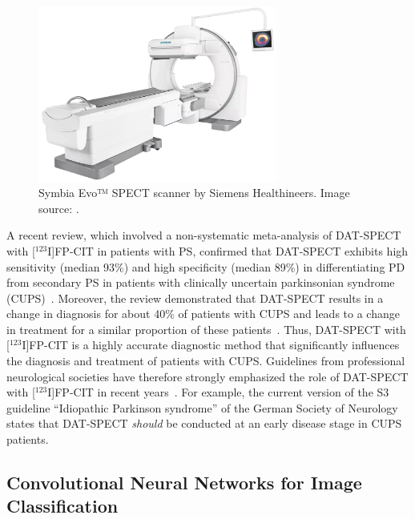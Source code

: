 \begin{figure}[ht]
  \centering
  \includegraphics[width=0.7\textwidth]{content/figures/siemens-healthineers_MI_symbia-evo.png}
  \caption{Symbia Evo™ SPECT scanner by Siemens Healthineers. Image source: \cite{SymbiaEvo_siemens}.} 
  \label{fig:siemens-healthineers_MI_symbia-evo}
\end{figure}

A recent review, which involved a non-systematic meta-analysis of DAT-SPECT with [$^{123}$I]FP-CIT in patients with PS, 
confirmed that DAT-SPECT exhibits high sensitivity (median 93\%) and high specificity (median 89\%) 
in differentiating PD from secondary PS in patients with 
clinically uncertain parkinsonian syndrome (CUPS)~\citep{Buchert2019-ya}.
Moreover, the review demonstrated that DAT-SPECT results in a change in diagnosis for about 40\% of patients with CUPS
and leads to a change in treatment for a similar proportion of these patients~\citep{Buchert2019-ya}. 
Thus, DAT-SPECT with [$^{123}$I]FP-CIT is a highly accurate diagnostic method
that significantly influences the diagnosis and treatment of patients with CUPS.
Guidelines from professional neurological societies have therefore strongly emphasized 
the role of DAT-SPECT with [$^{123}$I]FP-CIT in recent years~\citep{Tatsch2013}.
For example, the current version of the S3 guideline “Idiopathic Parkinson syndrome” of the 
German Society of Neurology states that DAT-SPECT \textit{should} be conducted at an early disease stage in CUPS patients.

\subsection{Convolutional Neural Networks for Image Classification}
\label{subsec:randfors}

